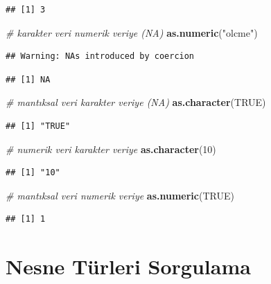 \documentclass[
  oneside]{book}
\newenvironment{Shaded}{\begin{snugshade}}{\end{snugshade}}
\newcommand{\CommentTok}[1]{\textcolor[rgb]{0.56,0.35,0.01}{\textit{#1}}}
\newcommand{\ConstantTok}[1]{\textcolor[rgb]{0.56,0.35,0.01}{#1}}
\newcommand{\DecValTok}[1]{\textcolor[rgb]{0.00,0.00,0.81}{#1}}
\newcommand{\FunctionTok}[1]{\textcolor[rgb]{0.13,0.29,0.53}{\textbf{#1}}}
\newcommand{\NormalTok}[1]{#1}
\newcommand{\StringTok}[1]{\textcolor[rgb]{0.31,0.60,0.02}{#1}}
\begin{document}
\begin{verbatim}
## [1] 3
\end{verbatim}

\begin{Shaded}
\begin{Highlighting}[]
\CommentTok{\# karakter veri numerik veriye (NA)}
\FunctionTok{as.numeric}\NormalTok{(}\StringTok{"olcme"}\NormalTok{)}
\end{Highlighting}
\end{Shaded}

\begin{verbatim}
## Warning: NAs introduced by coercion
\end{verbatim}

\begin{verbatim}
## [1] NA
\end{verbatim}

\begin{Shaded}
\begin{Highlighting}[]
\CommentTok{\# mantıksal veri karakter veriye (NA)}
\FunctionTok{as.character}\NormalTok{(}\ConstantTok{TRUE}\NormalTok{)}
\end{Highlighting}
\end{Shaded}

\begin{verbatim}
## [1] "TRUE"
\end{verbatim}

\begin{Shaded}
\begin{Highlighting}[]
\CommentTok{\# numerik veri karakter veriye}
\FunctionTok{as.character}\NormalTok{(}\DecValTok{10}\NormalTok{)}
\end{Highlighting}
\end{Shaded}

\begin{verbatim}
## [1] "10"
\end{verbatim}

\begin{Shaded}
\begin{Highlighting}[]
\CommentTok{\# mantıksal veri numerik veriye}
\FunctionTok{as.numeric}\NormalTok{(}\ConstantTok{TRUE}\NormalTok{)}
\end{Highlighting}
\end{Shaded}

\begin{verbatim}
## [1] 1
\end{verbatim}

\hypertarget{nesne-tuxfcrleri-sorgulama}{%
\section{Nesne Türleri Sorgulama}\label{nesne-tuxfcrleri-sorgulama}}
\end{document}
